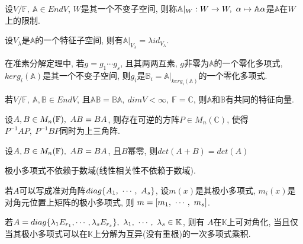 \begin{definition}[限制]
    设$V/\mathbb{F},\ \mathbb{A}\in EndV$, $W$是其一个不变子空间, 则称$\mathbb{A}|_W: W \to W,\ \alpha \mapsto \mathbb{A}\alpha$是$\mathbb{A}$在$W$上的限制.
\end{definition}

\begin{example}
    设$V_{\lambda}$是$\mathbb{A}$的一个特征子空间, 则有$\mathbb{A}|_{V_{\lambda}}=\lambda id_{V_{\lambda}}$.
\end{example}

\begin{example}
    在准素分解定理中, 若$g=g_1\cdots g_s$, 且其两两互素, $g$非零为$\mathbb{A}$的一个零化多项式, $kerg_i(\mathbb{A})$是其一个不变子空间, 
    则$g_i$是$\mathbb{B}_i=\mathbb{A}|_{kerg_i(\mathbb{A})}$的一个零化多项式.
\end{example}

\begin{example}
    若$V/\mathbb{F},\ \mathbb{A},\mathbb{B}\in EndV$, 且$\mathbb{A}\mathbb{B}=\mathbb{B}\mathbb{A},\ dimV<\infty,\ \mathbb{F}=\mathbb{C}$,
    则$\mathbb{A}$和$\mathbb{B}$有共同的特征向量.
\end{example}

\begin{example}
    设$A,B\in M_{n}(\mathbb{F}),\ AB=BA$, 则存在可逆的方阵$P\in M_n(\mathbb{C})$, 使得$P^{-1}AP,\ P^{-1}BP$同时为上三角阵.
\end{example}

\begin{example}
    设$A,B\in M_{n}(\mathbb{F}),\ AB=BA$, 且$B$幂零, 则$det(A+B)=det(A)$
\end{example}

\begin{statement}
    极小多项式不依赖于数域(线性相关性不依赖于数域).
\end{statement}

\begin{lemma}
    若$A$可以写成准对角阵$diag\{{A}{_1},\ \cdots,\ {A}{_{s}}\}$, 设$m(x)$是其极小多项式, $m_i(x)$是对角元位置上矩阵的极小多项式, 则
    $m=[{m}{_1},\ \cdots,\ {m}{_{s}}]$.
\end{lemma}

\begin{inference}
    若$A=diag\{\lambda{_1}E_{r_1},\cdots,\lambda{_s}E_{r_s}\},\ \vectorset{\lambda}{s}\in \mathbb{K}$, 则有
    $A$在$\mathbb{K}$上可对角化, 当且仅当其极小多项式可以在$\mathbb{K}$上分解为互异(没有重根)的一次多项式乘积.
\end{inference}

